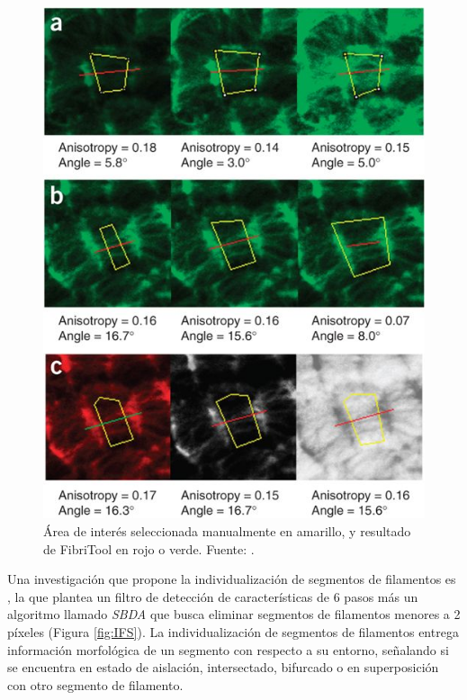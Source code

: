 \begin{figure}[h!]
        \centering
        \includegraphics[scale=0.6]{imagenes/fibritool.jpg}
        \caption{\'Area de inter\'es seleccionada manualmente en amarillo, y resultado de FibriTool en rojo o verde. Fuente: \cite{boudaoud2014fibriltool}.}
        \label{fig:fibritool}
\end{figure}

Una investigaci\'on que propone la individualizaci\'on de segmentos de filamentos es \cite{qiu2014quantitative}, la que plantea un filtro de detecci\'on de caracter\'isticas de 6 pasos m\'as un algoritmo llamado \textit{SBDA} que busca eliminar segmentos de filamentos menores a 2 p\'ixeles (Figura \ref{fig:IFS}). La individualizaci\'on de segmentos de filamentos entrega informaci\'on morfol\'ogica de un segmento con respecto a su entorno, se\~nalando si se encuentra en estado de aislaci\'on, intersectado, bifurcado o en superposici\'on con otro segmento de filamento.

